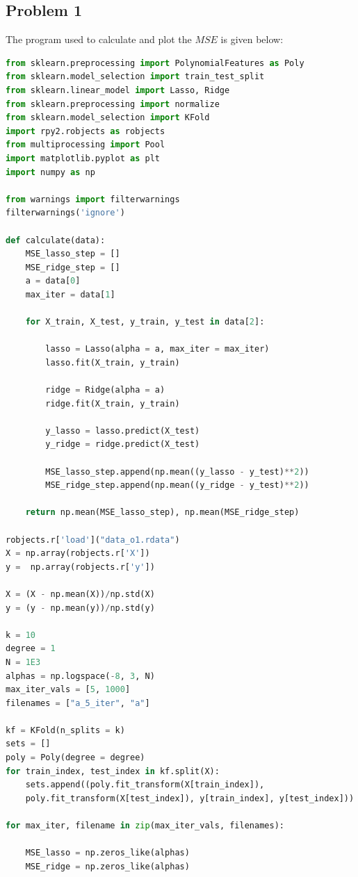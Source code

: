 \documentclass[a4paper,10pt,english]{article}
\begin{document}
\begin{multicols*}{2}
\subsection*{Problem 1}

The program used to calculate and plot the $MSE$ is given below:

\begin{lstlisting}[showstringspaces=false,language=Python,numbers=none]
from sklearn.preprocessing import PolynomialFeatures as Poly
from sklearn.model_selection import train_test_split
from sklearn.linear_model import Lasso, Ridge
from sklearn.preprocessing import normalize
from sklearn.model_selection import KFold
import rpy2.robjects as robjects
from multiprocessing import Pool
import matplotlib.pyplot as plt
import numpy as np

from warnings import filterwarnings
filterwarnings('ignore')

def calculate(data):
    MSE_lasso_step = []
    MSE_ridge_step = []
    a = data[0]
    max_iter = data[1]

    for X_train, X_test, y_train, y_test in data[2]:

        lasso = Lasso(alpha = a, max_iter = max_iter)
        lasso.fit(X_train, y_train)

        ridge = Ridge(alpha = a)
        ridge.fit(X_train, y_train)

        y_lasso = lasso.predict(X_test)
        y_ridge = ridge.predict(X_test)

        MSE_lasso_step.append(np.mean((y_lasso - y_test)**2))
        MSE_ridge_step.append(np.mean((y_ridge - y_test)**2))

    return np.mean(MSE_lasso_step), np.mean(MSE_ridge_step)

robjects.r['load']("data_o1.rdata")
X = np.array(robjects.r['X'])
y =  np.array(robjects.r['y'])

X = (X - np.mean(X))/np.std(X)
y = (y - np.mean(y))/np.std(y)

k = 10
degree = 1
N = 1E3
alphas = np.logspace(-8, 3, N)
max_iter_vals = [5, 1000]
filenames = ["a_5_iter", "a"]

kf = KFold(n_splits = k)
sets = []
poly = Poly(degree = degree)
for train_index, test_index in kf.split(X):
    sets.append((poly.fit_transform(X[train_index]),
    poly.fit_transform(X[test_index]), y[train_index], y[test_index]))

for max_iter, filename in zip(max_iter_vals, filenames):

    MSE_lasso = np.zeros_like(alphas)
    MSE_ridge = np.zeros_like(alphas)


\end{lstlisting}
\end{multicols*}
\end{document}
